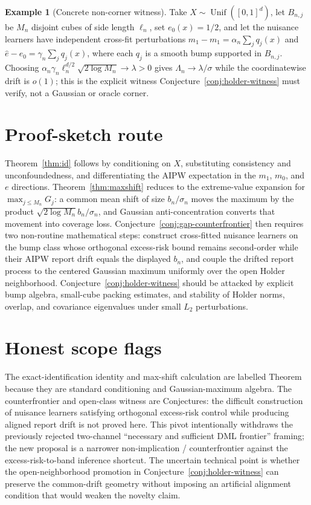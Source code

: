 \documentclass[11pt]{article}
\theoremstyle{definition}
\newtheorem{example}{Example}
\theoremstyle{plain}
\theoremstyle{remark}
\begin{document}
\begin{example}[Concrete non-corner witness]\label{ex:concrete-witness}
Take \(X\sim\operatorname{Unif}([0,1]^d)\), let \(B_{n,j}\) be \(M_n\) disjoint
cubes of side length \(\ell_n\), set \(e_0(x)=1/2\), and let the nuisance
learners have independent cross-fit perturbations
\(\widehat m_1-m_1=\alpha_n\sum_j q_j(x)\) and
\(\widehat e-e_0=\gamma_n\sum_j q_j(x)\), where each \(q_j\) is a smooth bump
supported in \(B_{n,j}\).  Choosing
\(\alpha_n\gamma_n\ell_n^{d/2}\sqrt{2\log M_n}\to\lambda>0\) gives
\(\Lambda_n\to\lambda/\sigma\) while the coordinatewise drift is \(o(1)\);
this is the explicit witness Conjecture~\ref{conj:holder-witness} must verify,
not a Gaussian or oracle corner.
\end{example}

\section{Proof-sketch route}
Theorem~\ref{thm:id} follows by conditioning on \(X\), substituting
consistency and unconfoundedness, and differentiating the AIPW expectation in
the \(m_1\), \(m_0\), and \(e\) directions.  Theorem~\ref{thm:maxshift} reduces
to the extreme-value expansion for \(\max_{j\leq M_n}G_j\): a common mean shift
of size \(b_n/\sigma_n\) moves the maximum by the product
\(\sqrt{2\log M_n}b_n/\sigma_n\), and Gaussian anti-concentration converts that
movement into coverage loss.  Conjecture~\ref{conj:gap-counterfrontier} then
requires two non-routine mathematical steps: construct cross-fitted nuisance
learners on the bump class whose orthogonal excess-risk bound remains
second-order while their AIPW report drift equals the displayed \(b_n\), and
couple the drifted report process to the centered Gaussian maximum uniformly
over the open Holder neighborhood.  Conjecture~\ref{conj:holder-witness} should
be attacked by explicit bump algebra, small-cube packing estimates, and
stability of Holder norms, overlap, and covariance eigenvalues under small
\(L_2\) perturbations.

\section{Honest scope flags}
The exact-identification identity and max-shift calculation are labelled
Theorem because they are standard conditioning and Gaussian-maximum algebra.
The counterfrontier and open-class witness are Conjectures: the difficult
construction of nuisance learners satisfying orthogonal excess-risk control
while producing aligned report drift is not proved here.  This pivot
intentionally withdraws the previously rejected two-channel ``necessary and
sufficient DML frontier'' framing; the new proposal is a narrower
non-implication / counterfrontier against the excess-risk-to-band inference
shortcut.  The uncertain technical point is whether the open-neighborhood
promotion in Conjecture~\ref{conj:holder-witness} can preserve the common-drift
geometry without imposing an artificial alignment condition that would weaken
the novelty claim.
\end{document}
